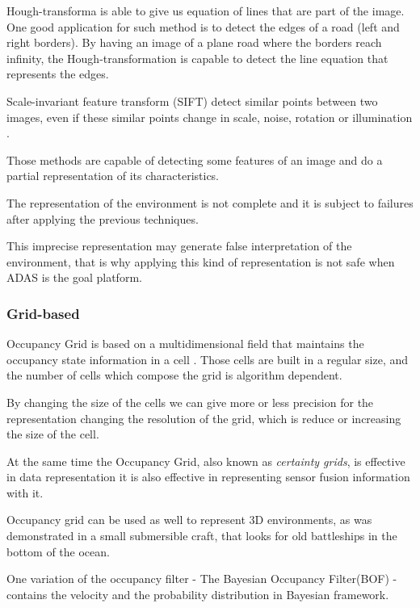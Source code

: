 Hough-transforma is able to give us equation of lines that are part of the image. One good application for such method is to detect the edges of a road (left and right borders). By having an image of a plane road where the borders reach infinity, the Hough-transformation is capable to detect the line equation that represents the edges. \cite{Ballard:1987:GHT:33517.33574}

Scale-invariant feature transform (SIFT) detect similar points between two images, even if these similar points change in scale, noise, rotation or illumination \cite{Lowe:1999:ORL:850924.851523}.

Those methods are capable of detecting some features of an image and do a partial representation of its characteristics. 

The representation of the environment is not complete and it is subject to failures after applying the previous techniques.

This imprecise representation may generate false interpretation of the environment, that is why applying this kind of representation is not safe when ADAS is the goal platform.

\subsubsection{Grid-based}
\label{ch02:gridbased}

Occupancy Grid is based on a multidimensional field that maintains the occupancy state information in a cell \cite{Elfes:1989:UOG:68491.68495}. Those cells are built in a regular size, and the number of cells which compose the grid is algorithm dependent.

By changing the size of the cells we can give more or less precision for the representation changing the resolution of the grid, which is reduce or increasing the size of the cell.

At the same time the Occupancy Grid, also known as \textit{certainty grids}, is effective in data representation it is also effective in representing sensor fusion information with it. 

Occupancy grid can be used as well to represent 3D environments, as was demonstrated in a small submersible craft, that looks for old battleships in the bottom of the ocean\cite{DBLP:journals/aim/Moravec88}.

One variation of the occupancy filter - The Bayesian Occupancy Filter(BOF) \cite{coue:inria-00182004} - contains the velocity and the probability distribution in Bayesian framework.

